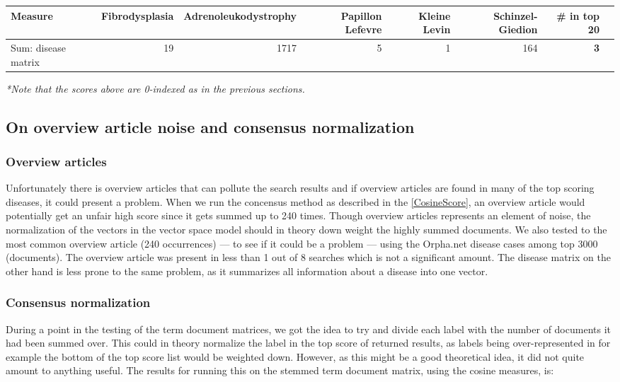 \begin{table}[H]
\begin{tiny}
  \begin{tabular}{|l|r|r|r|r|r|r|r|}
    \hline
    Measure & Fibrodysplasia & Adrenoleukodystrophy & Papillon Lefevre & Kleine Levin & Schinzel-Giedion & \scriptsize{\textbf{\# in top 20}}\\
    \hline
    Sum: disease matrix & 19 & 1717 & 5 & 1 & 164 & \scriptsize{\textbf{3}} \\
    \hline
    \end{tabular}
\end{tiny}
\end{table}

\noindent \small{\textit{*Note that the scores above are 0-indexed as in the previous sections.}}

\subsection{On overview article noise and consensus normalization\label{Overview}}

\subsubsection{Overview articles}
Unfortunately there is overview articles that can pollute the search
results and if overview articles are found in many of the top scoring
diseases, it could present a problem. When we run the concensus method
as described in the \ref{CosineScore}, an overview article would
potentially get an unfair high score since it gets summed up to 240
times. Though overview articles represents an element of noise, the
normalization of the vectors in the vector space model should in
theory down weight the highly summed documents. We also tested to the
most common overview article (240 occurrences) --- to see if it could
be a problem --- using the Orpha.net disease cases among top 3000
(documents). The overview article was present in less than 1 out of 8
searches which is not a significant amount. The disease matrix on the
other hand is less prone to the same problem, as it summarizes all
information about a disease into one vector.

\subsubsection{Consensus normalization}
During a point in the testing of the term document matrices, we got
the idea to try and divide each label with the number of documents it
had been summed over. This could in theory normalize the label in the
top score of returned results, as labels being over-represented in for
example the bottom of the top score list would be weighted down.
However, as this might be a good theoretical idea, it did not quite
amount to anything useful. The results for running this on the stemmed
term document matrix, using the cosine measures, is:\\

